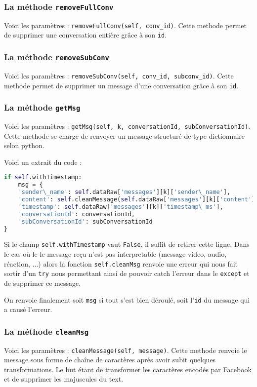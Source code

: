 \documentclass[10pt,a4paper]{article}
\begin{document}
\subsubsection{La méthode \texttt{removeFullConv}}
Voici les paramètres : \texttt{removeFullConv(self, conv\_id)}. Cette methode permet de supprimer une conversation entière grâce à son \texttt{id}.

\subsubsection{La méthode \texttt{removeSubConv}}
Voici les paramètres : \texttt{removeSubConv(self, conv\_id, subconv\_id)}. Cette methode permet de supprimer un message d'une conversation grâce à son \texttt{id}.

\subsubsection{La méthode \texttt{getMsg}}
Voici les paramètres : \texttt{getMsg(self, k, conversationId, subConversationId)}. Cette methode se charge de renvoyer un message structuré de type dictionnaire selon python. 

Voici un extrait du code :
\begin{lstlisting}[language=Python]
if self.withTimestamp:
	msg = {
	'sender\_name': self.dataRaw['messages'][k]['sender\_name'],
	'content': self.cleanMessage(self.dataRaw['messages'][k]['content']),
	'timestamp': self.dataRaw['messages'][k]['timestamp\_ms'],
	'conversationId': conversationId,
	'subConversationId': subConversationId
}
\end{lstlisting}

Si le champ \texttt{self.withTimestamp} vaut \texttt{False}, il suffit de retirer cette ligne. Dans le cas où le le message reçu n'est pas interpretable (message video, audio, réaction, ...) alors la fonction \texttt{self.cleanMsg} renvoie une erreur qui nous fait sortir d'un \texttt{try} nous permettant ainsi de pouvoir catch l'erreur dans le \texttt{except} et de supprimer ce message.

On renvoie finalement soit \texttt{msg} si tout s'est bien déroulé, soit l'\texttt{id} du message qui a causé l'erreur.

\subsubsection{La méthode \texttt{cleanMsg}}
Voici les paramètres : \texttt{cleanMessage(self, message)}. Cette methode renvoie le message sous forme de chaîne de caractères après avoir subit quelques transformations. Le but étant de transformer les caractères encodés par Facebook et de supprimer les majuscules du text.
\end{document}
